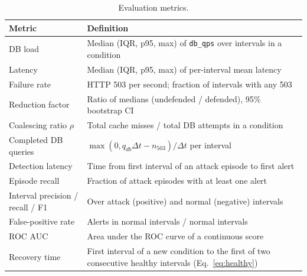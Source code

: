 \documentclass[preprint,12pt]{elsarticle}
\begin{document}
\begin{table}[t]
\centering
\caption{Evaluation metrics.}
\label{tab:metric-defs}
\small
\begin{tabularx}{\linewidth}{@{}L{3.6cm}Y@{}}
\toprule
Metric & Definition \\
\midrule
DB load & Median (IQR, p95, max) of \texttt{db\_qps} over intervals in a condition \\
Latency & Median (IQR, p95, max) of per-interval mean latency \\
Failure rate & HTTP 503 per second; fraction of intervals with any 503 \\
Reduction factor & Ratio of medians (undefended / defended), 95\% bootstrap CI \cite{efron1994} \\
Coalescing ratio $\rho$ & Total cache misses / total DB attempts in a condition \\
Completed DB queries & $\max(0, q_{db}\Delta t - n_{503})/\Delta t$ per interval \\
Detection latency & Time from first interval of an attack episode to first alert \\
Episode recall & Fraction of attack episodes with at least one alert \\
Interval precision / recall / F1 & Over attack (positive) and normal (negative) intervals \\
False-positive rate & Alerts in normal intervals / normal intervals \\
ROC AUC & Area under the ROC curve of a continuous score \cite{fawcett2006} \\
Recovery time & First interval of a new condition to the first of two consecutive healthy intervals (Eq.~\ref{eq:healthy}) \\
\bottomrule
\end{tabularx}
\end{table}
\end{document}
